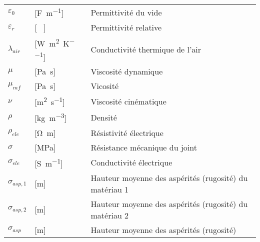 \begin{longtable}{l p{2.5cm} p{4in}}
	$\varepsilon_0$   & [\si{\farad\per\metre}]                             & Permittivité du vide                                                                  \\
	$\varepsilon_r$   & [ \ ]                                               & Permittivité relative                                                                 \\
	$\lambda_{air}$   & [\si{\watt\per\square\metre\per\kelvin}]            & Conductivité thermique de l'air                                                       \\
	$\mu$             & [\si{\pascal\second}]                               & Viscosité dynamique                                                                   \\
	$\mu_{mf}$        & [\si{\pascal\second}]                               & Vicosité                                                                              \\
	$\nu$             & [\si{\square\metre\per\second}]                     & Viscosité cinématique                                                                 \\
	$\rho$            & [\si{\kilogram\per\cubic\metre}]                    & Densité                                                                               \\
	$\rho_{ele}$      & [\si{\ohm\metre}]                                   & Résistivité électrique                                                                \\
	$\sigma$          & [\si{\mega\pascal}]                                 & Résistance mécanique du joint                                                         \\
	$\sigma_{ele}$    & [\si{\siemens\per\metre}]                           & Conductivité électrique                                                               \\
	$\sigma_{asp,1}$  & [\si{\metre}]                                       & Hauteur moyenne des aspérités (rugosité) du matériau 1                                \\
	$\sigma_{asp,2}$  & [\si{\metre}]                                       & Hauteur moyenne des aspérités (rugosité) du matériau 2                                \\
	$\sigma_{asp}$    & [\si{\metre}]                                       & Hauteur moyenne des aspérités (rugosité)                                              \\

\end{longtable}
